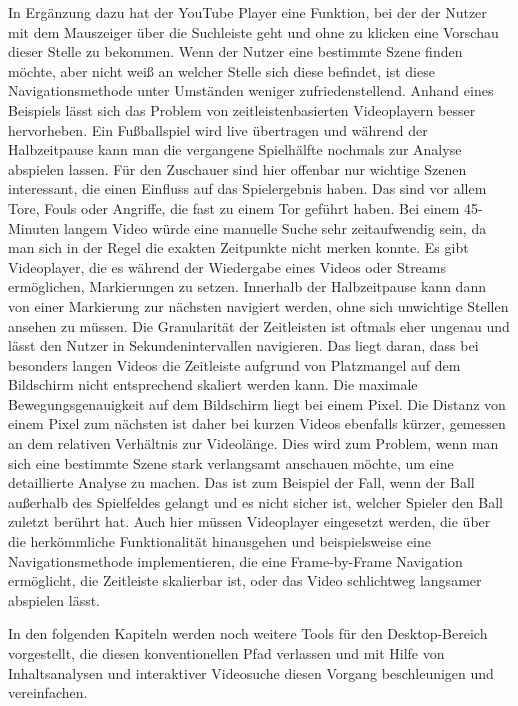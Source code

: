 \documentclass[11pt,a4paper]{report}
\begin{document}
In Ergänzung dazu hat der YouTube Player eine Funktion, bei der der Nutzer mit dem Mauszeiger über die Suchleiste geht und ohne zu klicken eine Vorschau dieser Stelle zu bekommen. Wenn der Nutzer eine bestimmte Szene finden möchte, aber nicht weiß an welcher Stelle sich diese befindet, ist diese Navigationsmethode unter Umständen weniger zufriedenstellend. Anhand eines Beispiels lässt sich das Problem von zeitleistenbasierten Videoplayern besser hervorheben. Ein Fußballspiel wird live übertragen und während der Halbzeitpause kann man die vergangene Spielhälfte nochmals zur Analyse abspielen lassen. Für den Zuschauer sind hier offenbar nur wichtige Szenen interessant, die einen Einfluss auf das Spielergebnis haben. Das sind vor allem Tore, Fouls oder Angriffe, die fast zu einem Tor geführt haben. Bei einem 45-Minuten langem Video würde eine manuelle Suche sehr zeitaufwendig sein, da man sich in der Regel die exakten Zeitpunkte nicht merken konnte. Es gibt Videoplayer, die es während der Wiedergabe eines Videos oder Streams ermöglichen, Markierungen zu setzen. Innerhalb der Halbzeitpause kann dann von einer Markierung zur nächsten navigiert werden, ohne sich unwichtige Stellen ansehen zu müssen. Die Granularität der Zeitleisten ist oftmals eher ungenau und lässt den Nutzer in Sekundenintervallen navigieren. Das liegt daran, dass bei besonders langen Videos die Zeitleiste aufgrund von Platzmangel auf dem Bildschirm nicht entsprechend skaliert werden kann. Die maximale Bewegungsgenauigkeit auf dem Bildschirm liegt bei einem Pixel. Die Distanz von einem Pixel zum nächsten ist daher bei kurzen Videos ebenfalls kürzer, gemessen an dem relativen Verhältnis zur Videolänge. Dies wird zum Problem, wenn man sich eine bestimmte Szene stark verlangsamt anschauen möchte, um eine detaillierte Analyse zu machen. Das ist zum Beispiel der Fall, wenn der Ball außerhalb des Spielfeldes gelangt und es nicht sicher ist, welcher Spieler den Ball zuletzt berührt hat. Auch hier müssen Videoplayer eingesetzt werden, die über die herkömmliche Funktionalität hinausgehen und beispielsweise eine Navigationsmethode implementieren, die eine Frame-by-Frame Navigation ermöglicht, die Zeitleiste skalierbar ist, oder das Video schlichtweg langsamer abspielen lässt. \cite{furht2009handbook}

In den folgenden Kapiteln werden noch weitere Tools für den Desktop-Bereich vorgestellt, die diesen konventionellen Pfad verlassen und mit Hilfe von Inhaltsanalysen und interaktiver Videosuche diesen Vorgang beschleunigen und vereinfachen.
\end{document}
